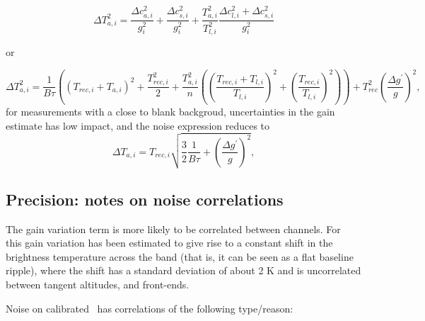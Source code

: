 \begin{equation}
\Delta T_{a,i}^{2} =  \frac{\Delta c_{a,i}^{2}}{g_{i}^2} + \frac{\Delta c_{s,i}^{2}}{g_{i}^2} +
     \frac{T_{a,i}^{2}}{T_{l,i}^2} \frac{\Delta c_{l,i}^{2} + \Delta c_{s,i}^{2}}{g_{i}^{2}}
\end{equation}

or

\begin{equation}
\Delta T_{a,i}^{2} =  \frac{1}{B\tau} \left( (T_{rec,i}+T_{a,i})^2 + \frac{T_{rec,i}^2}{2} + 
   \frac{T_{a,i}^{2}}{n} \left( \left( \frac{T_{rec,i} + T_{l,i}}{T_{l,i}} \right)^2 + \left( \frac{T_{rec,i} }{T_{l,i}} \right)^2 \right) \right) 
   + T_{rec}^{2}\left(\frac{\Delta g^{'}}{g}\right)^{2},
\end{equation}
for measurements with a close to blank backgroud, uncertainties in the gain estimate has low impact, and
the noise expression reduces to
\begin{equation}
\Delta T_{a,i} =  T_{rec,i}\sqrt{\frac{3}{2}\frac{1}{B\tau} + \left(\frac{\Delta g^{'}}{g}\right)^{2} },
\end{equation}




\subsection*{Precision: notes on noise correlations}

The gain variation term is more likely to be correlated between channels.
For \smr\, this gain variation has been estimated to give rise to a constant 
shift in the brightness temperature across the band (that is, it can 
be seen as a flat baseline ripple), where the shift
has a standard deviation of about 2 K and is uncorrelated 
between tangent altitudes, and front-ends.

Noise on calibrated \smr\ has correlations of the following type/reason:

